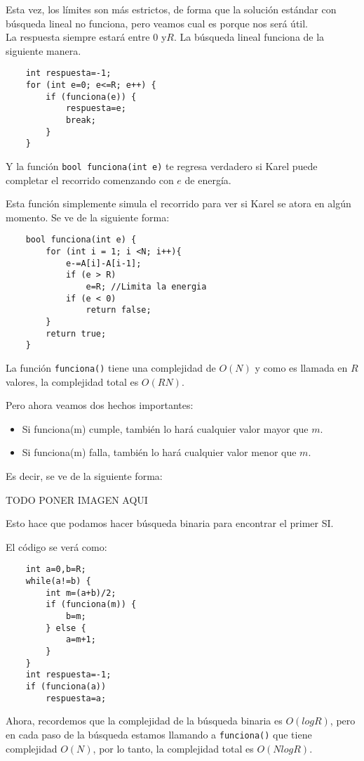 Esta vez, los límites son más estrictos, de forma que la solución estándar con búsqueda lineal no funciona, pero veamos cual es porque nos será útil.
\\

La respuesta siempre estará entre \(0\)  y\(R\). La búsqueda lineal funciona de la siguiente manera.
\begin{lstlisting}
	int respuesta=-1;
	for (int e=0; e<=R; e++) {
		if (funciona(e)) {
			respuesta=e;
			break;
		}
	}
\end{lstlisting}

Y la función \verb|bool funciona(int e)| te regresa verdadero si Karel puede completar el recorrido comenzando con \(e\) de energía.

Esta función simplemente simula el recorrido para ver si Karel se atora en algún momento. Se ve de la siguiente forma:

\begin{lstlisting}
	bool funciona(int e) {
		for (int i = 1; i <N; i++){
			e-=A[i]-A[i-1];
			if (e > R) 
				e=R; //Limita la energia
			if (e < 0)
				return false;			
		}
		return true;
	}
\end{lstlisting}

La función \verb|funciona()| tiene una complejidad de \(O(N)\) y como es llamada en \(R\) valores, la complejidad total es \(O(RN)\).

Pero ahora veamos dos hechos importantes:
\begin{itemize}
	\item Si funciona(m) cumple, también lo hará cualquier valor mayor que \(m\).
	\item Si funciona(m) falla, también lo hará cualquier valor menor que \(m\).
\end{itemize}

Es decir, se ve de la siguiente forma:

TODO PONER IMAGEN AQUI

Esto hace que podamos hacer búsqueda binaria para encontrar el primer SI.

El código se verá como:

\begin{lstlisting}
	int a=0,b=R;
	while(a!=b) {
		int m=(a+b)/2;
		if (funciona(m)) {
			b=m;
		} else {
			a=m+1;
		}
	}
	int respuesta=-1;
	if (funciona(a))
		respuesta=a;
\end{lstlisting}

Ahora, recordemos que la complejidad de la búsqueda binaria es \(O(logR)\), pero en cada paso de la búsqueda estamos llamando a \verb|funciona()| que tiene complejidad \(O(N)\), por lo tanto, la complejidad total es \(O(NlogR)\).

